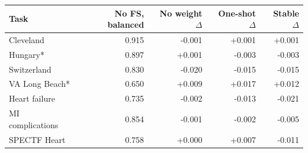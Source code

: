 \begin{tabular}{lrrrr}
\toprule
Task & No FS, balanced & No weight $\Delta$ & One-shot $\Delta$ & Stable $\Delta$ \\
\midrule
Cleveland & 0.915 & -0.001 & +0.001 & +0.001 \\
Hungary* & 0.897 & +0.001 & -0.003 & -0.003 \\
Switzerland & 0.830 & -0.020 & -0.015 & -0.015 \\
VA Long Beach* & 0.650 & +0.009 & +0.017 & +0.012 \\
Heart failure & 0.735 & -0.002 & -0.013 & -0.021 \\
MI complications & 0.854 & -0.001 & -0.002 & -0.005 \\
SPECTF Heart & 0.758 & +0.000 & +0.007 & -0.011 \\
\bottomrule
\end{tabular}

